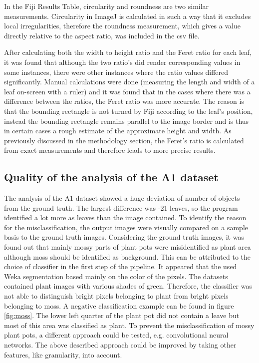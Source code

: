 \documentclass[paper=A4,bibliography=totocnumbered]{scrartcl}
\begin{document}
In  the Fiji Results Table, circularity and roundness are two similar measurements. Circularity in ImageJ is calculated in such a way that it excludes local irregularities, therefore the roundness measurement, which gives a value directly relative to the aspect ratio, was included in the csv file. 

After calculating both the width to height ratio and the Feret ratio for each leaf, it was found that although the two ratio's did render corresponding values in some instances, there were other instances where the ratio values differed significantly. Manual calculations were done (measuring the length and width of a leaf on-screen with a ruler) and it was found that in the cases where there was a difference between the ratios, the Feret ratio was more accurate. The reason is that the bounding rectangle is not turned by Fiji according to the leaf's position, instead the bounding rectangle remains parallel to the image border and is thus in certain cases a rough estimate of the approximate height and width. As previously discussed in the methodology section, the Feret's ratio is calculated from exact measurements and therefore leads to more precise results. 

\subsection{Quality of the analysis of the A1 dataset}
The analysis of the A1 dataset showed a huge deviation of number of objects from the ground truth. The largest difference was -21 leaves, so the program identified a lot more as leaves than the image contained. To identify the reason for the misclassification, the output images were visually compared on a sample basis to the ground truth images. Considering the ground truth images, it was found out that mainly mossy parts of plant pots were misidentified as plant area although moss should be identified as background. This can be attributed to the choice of classifier in the first step of the pipeline. It appeared that the used Weka segmentation based mainly on the color of the pixels. The datasets contained plant images with various shades of green. Therefore, the classifier was not able to distinguish bright pixels belonging to plant from bright pixels belonging to moss. A negative classification example can be found in figure \ref{fig:moss}. The lower left quarter of the plant pot did not contain a leave but most of this area was classified as plant. 
To prevent the misclassification of mossy plant pots, a different approach could be tested, e.g. convolutional neural networks. The above described approach could be improved by taking other features, like granularity, into account.
\end{document}
